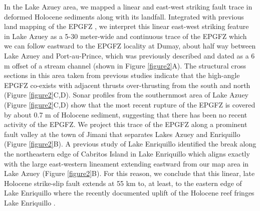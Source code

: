 \documentclass{nature}
\begin{document}
In the Lake Azuey area, we mapped a linear and east-west striking fault trace in deformed Holocene sediments along with its landfall. Integrated with previous land mapping of the EPGFZ \citep{mann1995actively,prentice2010seismic,cowgill2012interactive}, we interpret this linear east-west striking feature in Lake Azuey as a 5-30 meter-wide and continuous trace of the EPGFZ which we can follow eastward to the EPGFZ locality at Dumay, about half way between Lake Azuey and Port-au-Prince, which was previously described and dated as a 6 m offset of a stream channel \citep{cowgill2012interactive} (shown in Figure \ref{figure2}A). The structural cross sections in this area taken from previous studies \citep{massoni1955haiti,mann1995actively,douilly2015three} indicate that the high-angle EPGFZ co-exists with adjacent thrusts over-thrusting from the south and north (Figure \ref{figure2}C,D). Sonar profiles from the southernmost area of Lake Azuey (Figure \ref{figure2}C,D) show that the most recent rupture of the EPGFZ is covered by about 0.7 m of Holocene sediment, suggesting that there has been no recent activity of the EPGFZ. We project this trace of the EPGFZ along a prominent fault valley at the town of Jimani that separates Lakes Azuey and Enriquillo (Figure \ref{figure2}B). A previous study of Lake Enriquillo \citep{rios2013holocene} identified the break along the northeastern edge of Cabritos Island in Lake Enriquillo which aligns exactly with the large east-western lineament extending eastward from our map area in Lake Azuey (Figure \ref{figure2}B). For this reason, we conclude that this linear, late Holocene strike-slip fault extends at 55 km to, at least, to the eastern edge of Lake Enriquillo where the recently documented uplift of the Holocene reef fringes Lake Enriquillo \citep{mann1995actively}.  
\end{document}
